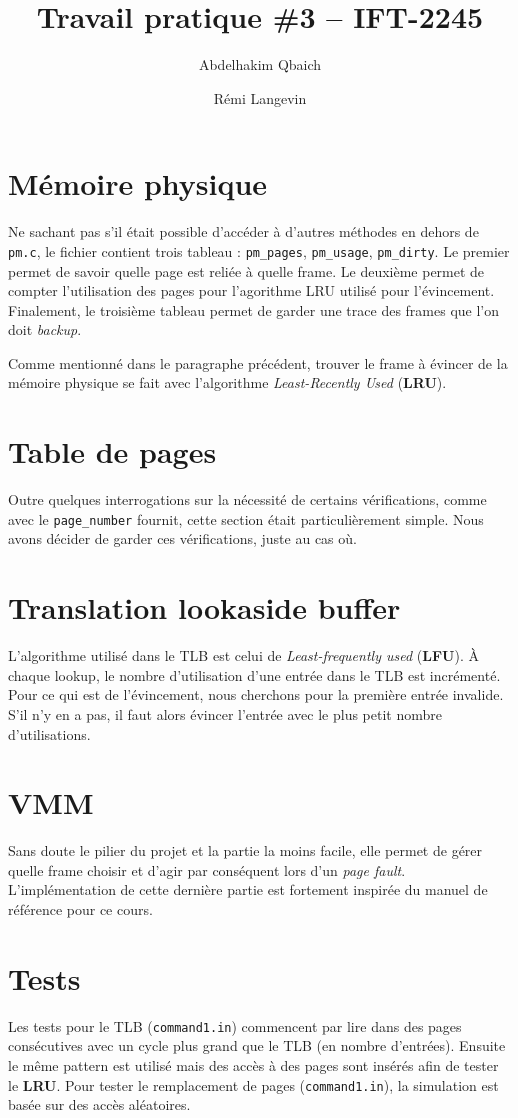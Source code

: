 \documentclass{article}
\title{Travail pratique \#3 -- IFT-2245}
\author{Abdelhakim Qbaich \and Rémi Langevin}
\begin{document}
\maketitle

\section{Mémoire physique}

Ne sachant pas s'il était possible d'accéder à d'autres méthodes en dehors de \texttt{pm.c}, le fichier contient trois tableau : \texttt{pm\_pages}, \texttt{pm\_usage}, \texttt{pm\_dirty}. Le premier permet de savoir quelle page est reliée à quelle frame. Le deuxième permet de compter l'utilisation des pages pour l'agorithme LRU utilisé pour l'évincement. Finalement, le troisième tableau permet de garder une trace des frames que l'on doit \textit{backup}.

Comme mentionné dans le paragraphe précédent, trouver le frame à évincer de la mémoire physique se fait avec l'algorithme \textit{Least-Recently Used} (\textbf{LRU}).

\section{Table de pages}

Outre quelques interrogations sur la nécessité de certains vérifications, comme avec le \texttt{page\_number} fournit, cette section était particulièrement simple. Nous avons décider de garder ces vérifications, juste au cas où.

\section{Translation lookaside buffer}

L'algorithme utilisé dans le TLB est celui de \textit{Least-frequently used} (\textbf{LFU}).
À chaque lookup, le nombre d'utilisation d'une entrée dans le TLB est incrémenté. Pour ce qui est de l'évincement, nous cherchons pour la première entrée invalide. S'il n'y en a pas, il faut alors évincer l'entrée avec le plus petit nombre d'utilisations.

\section{VMM}

Sans doute le pilier du projet et la partie la moins facile, elle permet de gérer quelle frame choisir et d'agir par conséquent lors d'un \textit{page fault}. L'implémentation de cette dernière partie est fortement inspirée du manuel de référence pour ce cours.

\section{Tests}

Les tests pour le TLB (\texttt{command1.in}) commencent par lire dans des pages
consécutives avec un cycle plus grand que le TLB (en nombre d'entrées). Ensuite
le même pattern est utilisé mais des accès à des pages sont insérés afin de
tester le \textbf{LRU}.
Pour tester le remplacement de pages (\texttt{command1.in}), la simulation est basée sur
des accès aléatoires.
\end{document}
